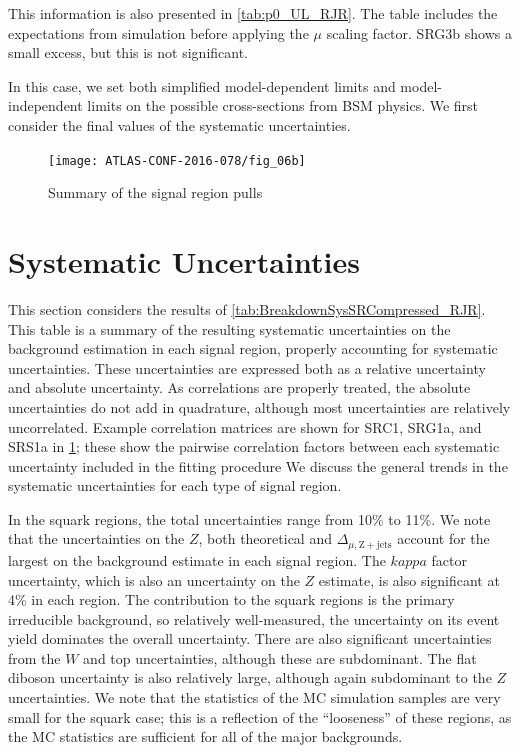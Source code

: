 This information is also presented in \ref{tab:p0_UL_RJR}.
The table includes the expectations from simulation before applying the $\mu$ scaling factor.
SRG3b shows a small excess, but this is not significant.

In this case, we set both simplified model-dependent limits and model-independent limits on the possible cross-sections from BSM physics.
We first consider the final values of the systematic uncertainties.


\begin{figure}[tbph]
\centering
\caption{Summary of the signal region pulls} \label{fig:sr_summary}
\texttt{[image: ATLAS-CONF-2016-078/fig\_06b]}
\end{figure}


\section{Systematic Uncertainties}

This section considers the results of \ref{tab:BreakdownSysSRCompressed_RJR}.
This table is a summary of the resulting systematic uncertainties on the background estimation in each signal region, properly accounting for systematic uncertainties.
These uncertainties are expressed both as a relative uncertainty and absolute uncertainty.
As correlations are properly treated, the absolute uncertainties do not add in quadrature, although most uncertainties are relatively uncorrelated.
Example correlation matrices are shown for SRC1, SRG1a, and SRS1a in \ref{}; these show the pairwise correlation factors between each systematic uncertainty included in the fitting procedure 
We discuss the general trends in the systematic uncertainties for each type of signal region.

In the squark regions, the total uncertainties range from 10\% to 11\%.
We note that the uncertainties on the $Z$, both theoretical and $\Delta_{\mu,\mathrm{Z+jets}}$ account for the largest on the background estimate in each signal region.
The $kappa$ factor uncertainty, which is also an uncertainty on the $Z$ estimate, is also significant at 4\% in each region.
The \Zvv contribution to the squark regions is the primary irreducible background, so relatively well-measured, the uncertainty on its event yield dominates the overall uncertainty.
There are also significant uncertainties from the $W$ and top uncertainties, although these are subdominant.
The flat diboson uncertainty is also relatively large, although again subdominant to the $Z$ uncertainties.
We note that the statistics of the MC simulation samples are very small for the squark case; this is a reflection of the ``looseness'' of these regions, as the MC statistics are sufficient for all of the major backgrounds.

